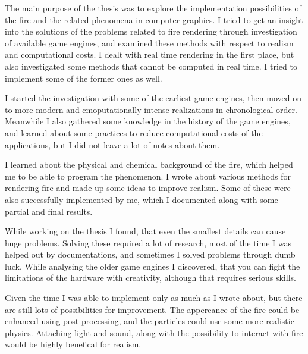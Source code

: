 

The main purpose of the thesis was to explore the implementation possibilities of the fire and the related phenomena in computer graphics. I tried to get an insight into the solutions of the problems related to fire rendering through investigation of available game engines, and examined these methods with respect to realism and computational costs. I dealt with real time rendering in the first place, but also investigated some methods that cannot be computed in real time. I tried to implement some of the former ones as well.

I started the investigation with some of the earliest game engines, then moved on to more modern and cmoputationally intense realizations in chronological order. Meanwhile I also gathered some knowledge in the history of the game engines, and learned about some practices to reduce computational costs of the applications, but I did not leave a lot of notes about them. 

I learned about the physical and chemical background of the fire, which helped me to be able to program the phenomenon. I wrote about various methods for rendering fire and made up some ideas to improve realism. Some of these were also successfully implemented by me, which I documented along with some partial and final results.

While working on the thesis I found, that even the smallest details can cause huge problems. Solving these required a lot of research, most of the time I was helped out by documentations, and sometimes I solved problems through dumb luck. While analysing the older game engines I discovered, that you can fight the limitations of the hardware with creativity, although that requires serious skills.

Given the time I was able to implement only as much as I wrote about, but there are still lots of possibilities for improvement. The appereance of the fire could be enhanced using post-processing, and the particles could use some more realistic physics. Attaching light and sound, along with the possibility to interact with fire would be highly benefical for realism.

